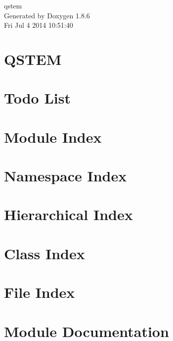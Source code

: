 \documentclass[twoside]{book}
\newcommand{\clearemptydoublepage}{%
  \newpage{\pagestyle{empty}\cleardoublepage}%
}
\begin{document}
\hypersetup{pageanchor=false}
\begin{titlepage}
\vspace*{7cm}
\begin{center}%
{\Large qstem }\\
\vspace*{1cm}
{\large Generated by Doxygen 1.8.6}\\
\vspace*{0.5cm}
{\small Fri Jul 4 2014 10:51:40}\\
\end{center}
\end{titlepage}
\clearemptydoublepage
\tableofcontents
\clearemptydoublepage
{}
\hypersetup{pageanchor=true}

\chapter{Q\-S\-T\-E\-M}
\label{md__r_e_a_d_m_e}
\hypertarget{md__r_e_a_d_m_e}{}

\chapter{Todo List}
\label{todo}
\hypertarget{todo}{}

\chapter{Module Index}

\chapter{Namespace Index}

\chapter{Hierarchical Index}

\chapter{Class Index}

\chapter{File Index}

\chapter{Module Documentation}



\end{document}
